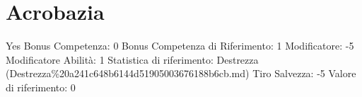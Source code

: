 \section{Acrobazia}\label{acrobazia}

\begin{description}
\tightlist
\item[Tags: ABI]
Yes Bonus Competenza: 0 Bonus Competenza di Riferimento: 1 Modificatore:
-5 Modificatore Abilità: 1 Statistica di riferimento: Destrezza
(Destrezza\%20a241c648b6144d51905003676188b6cb.md) Tiro Salvezza: -5
Valore di riferimento: 0
\end{description}
